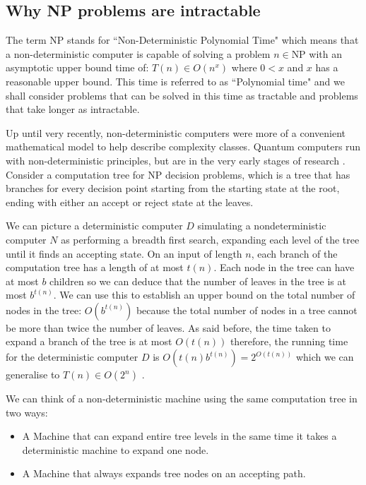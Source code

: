 \documentclass[11pt]{article}
\theoremstyle{definition}
\begin{document}
    \subsection{Why NP problems are intractable}
      The term NP stands for ``Non-Deterministic Polynomial Time" which means
      that a non-deterministic computer is capable of solving a problem
      $n \in \text{NP}$  with an asymptotic upper bound time of: $ T(n) \in O(n^{x}) $ where $0<x$ and $x$ has a reasonable
      upper bound. 
      This time is referred to as ``Polynomial time" and we shall consider problems that
      can be solved in this time as tractable and problems that take longer as
      intractable.

      Up until very recently, non-deterministic computers were more of a convenient 
      mathematical model to help describe complexity classes. Quantum computers
      run with non-deterministic principles, but are in the very early stages of research \cite{website:quantum}.
      Consider a computation tree for NP decision problems, which is a tree that has branches for
      every decision point starting from the starting state at the root, ending with 
      either an accept or reject state at the leaves.

      We can picture a deterministic computer $D$ simulating a nondeterministic computer $N$ as performing
      a breadth first search, expanding each level of the tree until it finds an accepting state.
      On an input of length $n$, each branch of the computation tree has a length of at most $t(n)$. Each
      node in the tree can have at most $b$ children so we can deduce that the number of leaves in the tree is
      at most $b^{t(n)}$. We can use this to establish an upper bound on the total number of nodes in the tree:
      $O(b^{t(n)})$ because the total number of nodes in a tree cannot be more than twice the number of leaves.
      As said before, the time taken to expand a branch of the tree is at most $O(t(n))$ therefore, the running time for
      the deterministic computer $D$ is $O(t(n)b^{t(n)}) = 2^{O(t(n))}$ which we can generalise
      to $T(n) \in O(2^{n})$ \cite{Sipser:2005}.

      We can think of a non-deterministic machine using the same computation tree in two ways:

      \begin{itemize}
        \setlength{\itemsep}{1pt}
        \setlength{\parskip}{0pt}
        \setlength{\parsep}{0pt}
        \item A Machine that can expand entire tree levels in the same time it takes a deterministic machine to expand one node.
        \item A Machine that always expands tree nodes on an accepting path.            
      \end{itemize}
       
\end{document}
